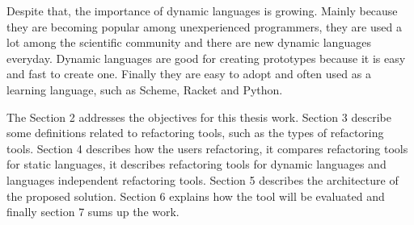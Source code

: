 Despite that, the importance of dynamic languages is growing.
Mainly because they are becoming popular among unexperienced programmers, they are used a lot among the scientific community and there are new dynamic languages everyday. 
Dynamic languages are good for creating prototypes because it is easy and fast to create one. 
Finally they are easy to adopt and often used as a learning language, such as Scheme, Racket and Python. %





The Section 2 addresses the objectives for this thesis work. 
Section 3 describe some definitions related to refactoring tools, such as the types of refactoring tools.
Section 4 describes how the users refactoring, it compares refactoring tools for static languages, it describes refactoring tools for dynamic languages and languages independent refactoring tools.
Section 5 describes the architecture of the proposed solution. 
Section 6 explains how the tool will be evaluated and finally section 7 sums up the work.



















